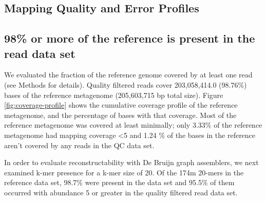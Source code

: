 \documentclass[10pt,a4paper,twocolumn]{article}
\begin{document}
\subsection*{Mapping Quality and Error Profiles}


\subsection*{98\% or more of the reference is present in the read data set}

We  evaluated the fraction of the reference genome covered by at
least one read (see Methods for details). Quality filtered
reads cover  203,058,414.0 (98.76\%) bases of the reference metagenome
(205,603,715 bp total size). 
Figure \ref{fig:coverage-profile} shows the cumulative coverage profile of the reference metagenome, and the percentage of bases with that coverage. Most of the reference metagenome was covered at least minimally; only 3.33\% of the reference metagenome had mapping coverage \textless 5 and 1.24 \% of the bases in the reference aren’t covered by any reads in the QC data set.


In order to evaluate reconstructability with De Bruijn graph assemblers, we next examined k-mer presence for a k-mer size of 20. Of the 174m 20-mers in the reference data set, 98.7\% were present in the data set and 95.5\% of them occurred with abundance 5 or greater in the quality filtered read data set.
\end{document}
